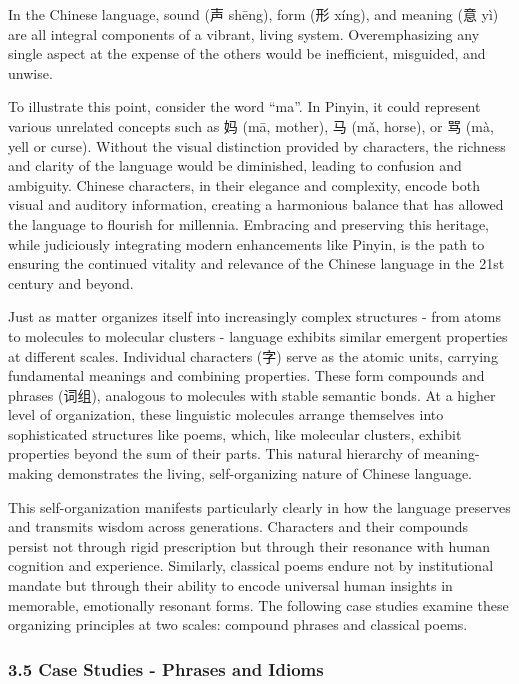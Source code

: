 \documentclass[
  11pt,
  letterpaper,
]{article}
\begin{document}
In the Chinese language, sound (声 shēng), form (形 xíng), and meaning
(意 yì) are all integral components of a vibrant, living system.
Overemphasizing any single aspect at the expense of the others would be
inefficient, misguided, and unwise.

To illustrate this point, consider the word ``ma''. In Pinyin, it could
represent various unrelated concepts such as 妈 (mā, mother), 马 (mǎ,
horse), or 骂 (mà, yell or curse). Without the visual distinction
provided by characters, the richness and clarity of the language would
be diminished, leading to confusion and ambiguity. Chinese characters,
in their elegance and complexity, encode both visual and auditory
information, creating a harmonious balance that has allowed the language
to flourish for millennia. Embracing and preserving this heritage, while
judiciously integrating modern enhancements like Pinyin, is the path to
ensuring the continued vitality and relevance of the Chinese language in
the 21st century and beyond.

Just as matter organizes itself into increasingly complex structures -
from atoms to molecules to molecular clusters - language exhibits
similar emergent properties at different scales. Individual characters
(字) serve as the atomic units, carrying fundamental meanings and
combining properties. These form compounds and phrases (词组), analogous
to molecules with stable semantic bonds. At a higher level of
organization, these linguistic molecules arrange themselves into
sophisticated structures like poems, which, like molecular clusters,
exhibit properties beyond the sum of their parts. This natural hierarchy
of meaning-making demonstrates the living, self-organizing nature of
Chinese language.

This self-organization manifests particularly clearly in how the
language preserves and transmits wisdom across generations. Characters
and their compounds persist not through rigid prescription but through
their resonance with human cognition and experience. Similarly,
classical poems endure not by institutional mandate but through their
ability to encode universal human insights in memorable, emotionally
resonant forms. The following case studies examine these organizing
principles at two scales: compound phrases and classical poems.

\hypertarget{case-studies---phrases-and-idioms}{%
\subsubsection{3.5 Case Studies - Phrases and
Idioms}\label{case-studies---phrases-and-idioms}}
\end{document}
